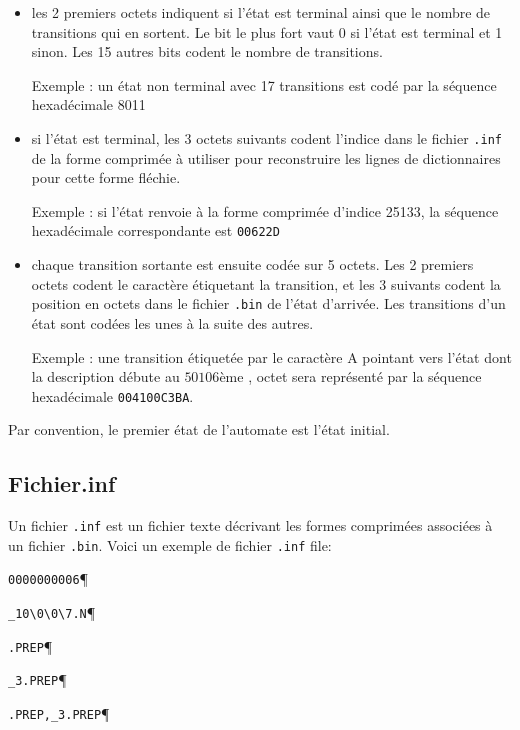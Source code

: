 \begin{itemize}

  \item les 2 premiers octets indiquent si l’état est terminal ainsi que le nombre de transitions
qui en sortent. Le bit le plus fort vaut 0 si l’état est terminal et 1 sinon. Les 15 autres
bits codent le nombre de transitions.

  \bigskip Exemple : un état non terminal avec 17 transitions est codé par la séquence hexadécimale
  8011

  \bigskip \item si l’état est terminal, les 3 octets suivants codent l’indice dans le fichier
  \verb+.inf+ de la forme comprimée à utiliser pour reconstruire les lignes de dictionnaires pour
  cette forme fléchie.

  \bigskip Exemple : si l’état renvoie à la forme comprimée d’indice 25133, la séquence hexadécimale
  correspondante est \verb+00622D+
  

  \bigskip \item chaque transition sortante est ensuite codée sur 5 octets. Les 2 premiers octets
  codent le caractère étiquetant la transition, et les 3 suivants codent la position en octets dans
  le fichier \verb+.bin+ de l’état d’arrivée. Les transitions d’un état sont codées les unes à la
  suite des autres.


  \bigskip Exemple : une transition étiquetée par le caractère A pointant vers l’état dont la description débute au $50106$ème , octet sera représenté par la séquence hexadécimale \verb+004100C3BA+.

\end{itemize}

\bigskip
\noindent Par convention, le premier état de l’automate est l’état initial.

\subsection{Fichier.inf}
Un fichier \verb+.inf+ est un fichier texte décrivant les formes comprimées associées à un fichier \verb+.bin+. Voici un exemple de fichier \verb+.inf+ file:

\bigskip
\verb$0000000006$\P

\verb$_10\0\0\7.N$\P

\verb$.PREP$\P

\verb$_3.PREP$\P

\verb$.PREP,_3.PREP$\P

